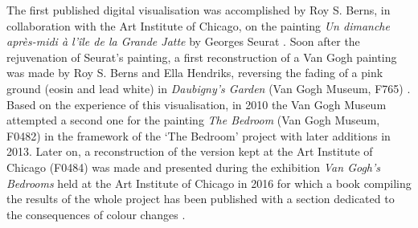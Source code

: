 The first published digital visualisation was accomplished by Roy S. Berns, in collaboration with the Art Institute of Chicago, on the painting \textit{Un dimanche après-midi à l'île de la Grande Jatte} by Georges Seurat \citep{berns_rejuvenating_2005,berns_rejuvenating_2006}. Soon after the rejuvenation of Seurat's painting, a first reconstruction of a Van Gogh painting was made by Roy S. Berns and Ella Hendriks, reversing the fading of a pink ground (eosin and lead white) in \textit{Daubigny’s Garden} (Van Gogh Museum, F765) \citep[179–80, Figures 7.7, 7.8a and b]{stoner_conservation_2012}. Based on the experience of this visualisation, in 2010 the Van Gogh Museum attempted a second one for the painting \textit{The Bedroom} (Van Gogh Museum, F0482) in the framework of the ‘The Bedroom’ project with later additions in 2013. Later on, a reconstruction of the version kept at the Art Institute of Chicago (F0484) was made and presented during the exhibition \textit{Van Gogh’s Bedrooms} held at the Art Institute of Chicago in 2016 for which a book compiling the results of the whole project has been published with a section dedicated to the consequences of colour changes \citep[89–91]{fiedler_materials_2016}.\\


